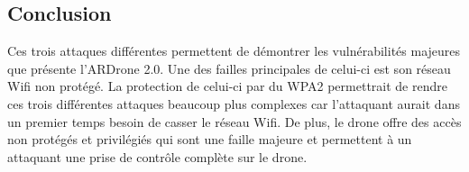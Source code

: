 \documentclass[a4paper,12pt]{report}
\begin{document}
\subsection{Conclusion}
Ces trois attaques différentes permettent de démontrer les vulnérabilités majeures que présente l'ARDrone 2.0. Une des failles principales de celui-ci est son réseau Wifi non protégé. La protection de celui-ci par du WPA2 permettrait de rendre ces trois différentes attaques beaucoup plus complexes car l'attaquant aurait dans un premier temps besoin de casser le réseau Wifi. De plus, le drone offre des accès non protégés et privilégiés qui sont une faille majeure et permettent à un attaquant une prise de contrôle complète sur le drone.







\end{document}
